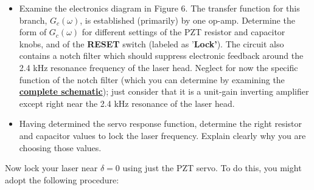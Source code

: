 \documentclass{../lab}
\begin{document}
\begin{itemize}
    \item Examine the electronics diagram in Figure 6. The transfer function for this branch, $G_c(\omega)$, is established (primarily) by one op-amp. Determine the form of $G_c(\omega)$ for different settings of the PZT resistor and capacitor knobs, and of the \textbf{RESET} switch (labeled as '\textbf{Lock'}). The circuit also contains a notch filter which should suppress electronic feedback around the 2.4 kHz resonance frequency of the laser head. Neglect for now the specific function of the notch filter (which you can determine by examining the \href{http://experimentationlab.berkeley.edu/sites/default/files/images/Full\_schematic.pdf}{\textbf{complete schematic}}); just consider that it is a unit-gain inverting amplifier except right near the 2.4 kHz resonance of the laser head.

    \item Having determined the servo response function, determine the right resistor and capacitor values to lock the laser frequency. Explain clearly why you are choosing those values.
\end{itemize}

Now lock your laser near $\delta = 0$ using just the PZT servo. To do this, you might adopt the following procedure:
\end{document}
